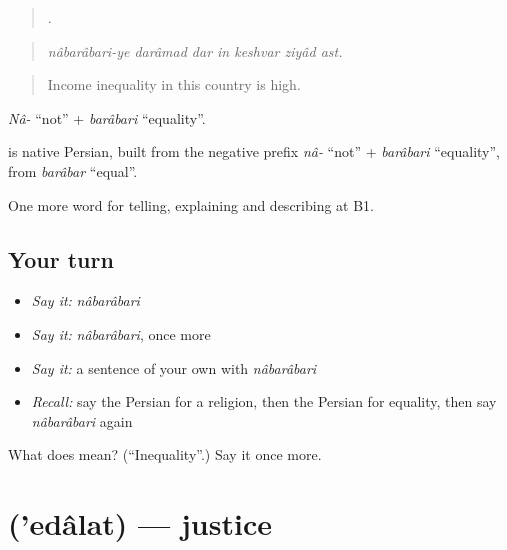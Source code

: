 \begin{quote}
      .
\end{quote}

\begin{quote}
\emph{nâbarâbari-ye darâmad dar in keshvar ziyâd ast.}
\end{quote}

\begin{quote}
Income inequality in this country is high.
\end{quote}

\emph{Nâ-} \textquotedblleft{}not\textquotedblright{} + \emph{barâbari} \textquotedblleft{}equality\textquotedblright{}.

\begin{cousinweb}
\textbf{} is native Persian, built from the negative prefix \emph{nâ-} \textquotedblleft{}not\textquotedblright{} + \emph{barâbari} \textquotedblleft{}equality\textquotedblright{}, from \emph{barâbar} \textquotedblleft{}equal\textquotedblright{}.
\end{cousinweb}

\begin{grammarlens}[title={What you've built}]
One more word for telling, explaining and describing at B1.
\end{grammarlens}

\subsection*{Your turn}
\begin{itemize}
\raggedright
  \item \emph{Say it:} \emph{nâbarâbari}
  \item \emph{Say it:} \emph{nâbarâbari}, once more
  \item \emph{Say it:} a sentence of your own with \emph{nâbarâbari}
  \item \emph{Recall:} say the Persian for a religion, then the Persian for equality, then say \emph{nâbarâbari} again
\end{itemize}

\begin{tcolorbox}[breakable,colback=teal!4,colframe=teal!35!black,title={Before you move on}]
What does  mean? (\textquotedblleft{}Inequality\textquotedblright{}.) Say it once more.
\end{tcolorbox}
\section[\texorpdfstring{\fa{عدالت} ('edâlat)}{عدالت ('edâlat)}]{ ('edâlat) — justice}

